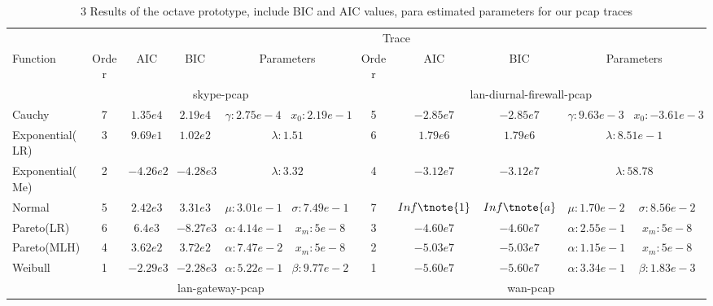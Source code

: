 \begin{table}
    \centering
    \caption{3 Results of the octave prototype, include BIC and AIC values, para estimated parameters for our pcap traces}
        \begin{threeparttable}[t]
        \begin{tabular}{lcccccccccc}
            \hline
            & \multicolumn{10}{c}{Trace} \\ \cline{2-11} 
            Function        & Order & AIC  & BIC  & \multicolumn{2}{c}{Parameters}  
            & Order & AIC & BIC  & \multicolumn{2}{c}{Parameters} \\ \hline 
            
            & \multicolumn{5}{c}{skype-pcap}  & \multicolumn{5}{c}{lan-diurnal-firewall-pcap}   \\ \hline 
            Cauchy          &    7 & $1.35e4$    & $2.19e4$    & $\gamma:2.75e-4$ & $x_0:2.19e-1$    
            &    5 & $-2.85e7$   & $-2.85e7$   & $\gamma:9.63e-3$ & $x_0:-3.61e-3$    \\
            Exponential(LR) &    3 & $9.69e1$   & $1.02e2$   & \multicolumn{2}{c}{$\lambda:1.51$}   
            &    6 & $1.79e6$    & $1.79e6$    & \multicolumn{2}{c}{$\lambda:8.51e-1$}    \\
            Exponential(Me) &    2 & $-4.26e2$   & $-4.28e3$   & \multicolumn{2}{c}{$\lambda:3.32$}   
            &    4 & $-3.12e7$   & $-3.12e7$   & \multicolumn{2}{c}{$ \lambda:58.78$} \\
            Normal          &    5 & $2.42e3$    & $3.31e3$    & $\mu:3.01e-1 $    & $\sigma:7.49e-1$ 
            &    7 & $Inf \tnote{1}$       & $Inf \tnote{a}$       & $\mu:1.70e-2$     & $\sigma:8.56e-2$ \\
            Pareto(LR)      &    6 & $6.4e3$   & $-8.27e3$   & $\alpha:4.14e-1$ & $x_m:5e-8$    
            &    3 & $-4.60e7$   & $-4.60e7$   & $\alpha:2.55e-1$ & $ x_m:5e-8$    \\
            Pareto(MLH)     &    4 & $3.62e2$   & $3.72e2$   & $\alpha:7.47e-2$ & $x_m:5e-8$    
            &    2 & $-5.03e7$   & $-5.03e7$   & $\alpha:1.15e-1$ & $ x_m:5e-8$    \\
            Weibull         &    1 & $-2.29e3$   & $-2.28e3$  & $\alpha:5.22e-1$ & $\beta:9.77e-2$  
            &    1 & $-5.60e7$   & $-5.60e7$   & $\alpha:3.34e-1$ & $\beta:1.83e-3$  \\ \hline    
            & \multicolumn{5}{c}{lan-gateway-pcap} & \multicolumn{5}{c}{wan-pcap}  \\ \hline

\end{tabular}
\end{threeparttable}
\end{table}
